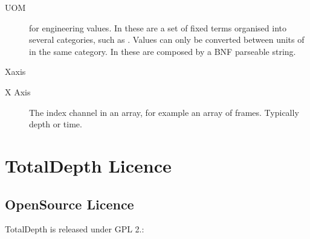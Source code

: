 \documentclass[letterpaper,10pt,english]{sphinxmanual}
\begin{document}
\begin{description}
\item[{UOM}] \leavevmode{}\label{\detokenize{glossary:term-uom}}
 for engineering values. In {\hyperref[\detokenize{glossary:term-lis}]{}} these are a set of fixed terms organised into several categories, such as . Values can only be converted between units of in the same category. In {\hyperref[\detokenize{glossary:term-rp66}]{}} these are composed by a BNF parseable string.

\item[{Xaxis}] \leavevmode{}\label{\detokenize{glossary:term-xaxis}}\item[{X Axis}] \leavevmode{}\label{\detokenize{glossary:term-x-axis}}
The index channel in an array, for example an array of frames. Typically depth or time.

\end{description}


\section{TotalDepth Licence}
\label{\detokenize{licence:licence-text}}\label{\detokenize{licence::doc}}\label{\detokenize{licence:totaldepth-licence}}

\subsection{OpenSource Licence}
\label{\detokenize{licence:opensource-licence}}
TotalDepth is released under GPL 2.:
\end{document}
